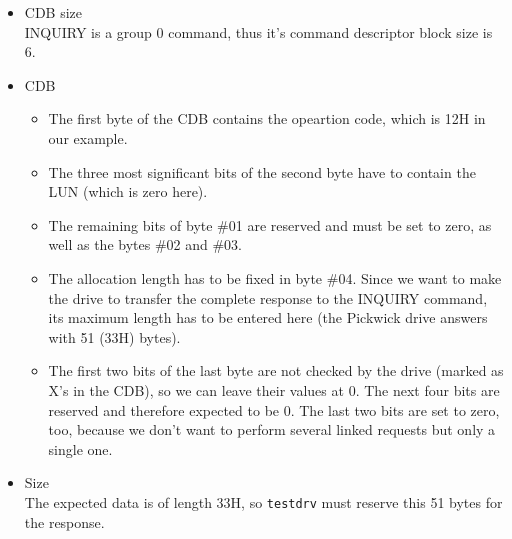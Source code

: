 \begin{itemize}

  \item CDB size \\
        INQUIRY is a group 0 command, thus it's command descriptor block size 
        is 6.

  \item CDB \\
        \begin{itemize}

          \item The first byte of the CDB contains the opeartion code, which 
                is 12H in our example.

          \item The three most significant bits of the second byte have to 
                contain the LUN (which is zero here).

          \item The remaining bits of byte \#01 are reserved and must be set 
                to zero, as well as the bytes \#02 and \#03.

          \item The allocation length has to be fixed in byte \#04. Since we 
                want to make the drive to transfer the complete response to 
                the INQUIRY command, its maximum length has to be entered here
                (the Pickwick drive answers with 51 (33H) bytes).

          \item The first two bits of the last byte are not checked by the 
                drive (marked as X's in the CDB), so we can leave their values
                at 0. The next four bits are reserved and therefore expected
                to be 0. The last two bits are set to zero, too, because we
                don't want to perform several linked requests but only a
                single one.

        \end{itemize}

  \item Size \\
        The expected data is of length 33H, so {\tt testdrv} must reserve this 
        51 bytes for the response.

\end{itemize}

